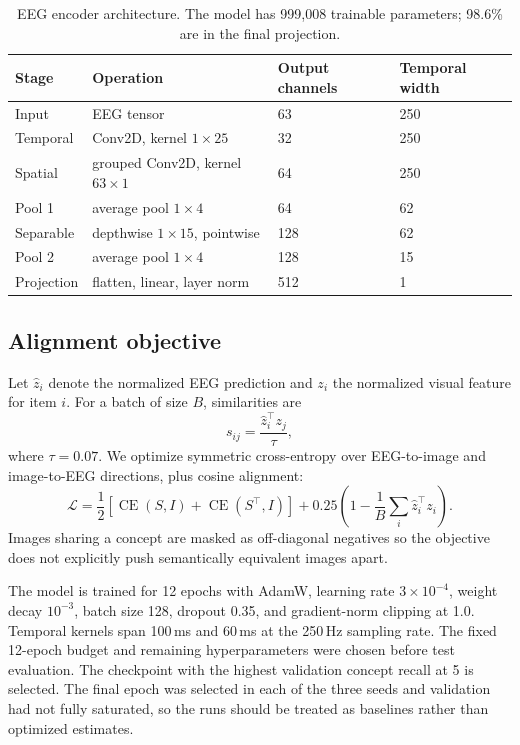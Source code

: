 \documentclass[10pt]{article}
\begin{document}
\begin{table}[t]
  \centering
  \caption{EEG encoder architecture. The model has 999,008 trainable
  parameters; 98.6\% are in the final projection.}
  \label{tab:architecture}
  \begin{tabular}{llll}
    \toprule
    Stage & Operation & Output channels & Temporal width\\
    \midrule
    Input & EEG tensor & 63 & 250\\
    Temporal & Conv2D, kernel $1\times25$ & 32 & 250\\
    Spatial & grouped Conv2D, kernel $63\times1$ & 64 & 250\\
    Pool 1 & average pool $1\times4$ & 64 & 62\\
    Separable & depthwise $1\times15$, pointwise & 128 & 62\\
    Pool 2 & average pool $1\times4$ & 128 & 15\\
    Projection & flatten, linear, layer norm & 512 & 1\\
    \bottomrule
  \end{tabular}
\end{table}

\subsection{Alignment objective}

Let $\hat{z}_i$ denote the normalized EEG prediction and $z_i$ the normalized
visual feature for item $i$. For a batch of size $B$, similarities are
\[
  s_{ij} = \frac{\hat{z}_i^\top z_j}{\tau},
\]
where $\tau=0.07$. We optimize symmetric cross-entropy over EEG-to-image and
image-to-EEG directions, plus cosine alignment:
\[
  \mathcal{L} =
  \frac{1}{2}\left[
    \operatorname{CE}(S,I)+\operatorname{CE}(S^\top,I)
  \right]
  + 0.25\left(1-\frac{1}{B}\sum_i \hat{z}_i^\top z_i\right).
\]
Images sharing a concept are masked as off-diagonal negatives so the objective
does not explicitly push semantically equivalent images apart.

The model is trained for 12 epochs with AdamW, learning rate
$3\times10^{-4}$, weight decay $10^{-3}$, batch size 128, dropout 0.35, and
gradient-norm clipping at 1.0. Temporal kernels span 100\,ms and 60\,ms at the
250\,Hz sampling rate. The fixed 12-epoch budget and remaining hyperparameters
were chosen before test evaluation. The checkpoint with the highest validation
concept recall at 5 is selected. The final epoch was selected in each of the
three seeds and validation had not fully saturated, so the runs should be
treated as baselines rather than optimized estimates.
\end{document}
